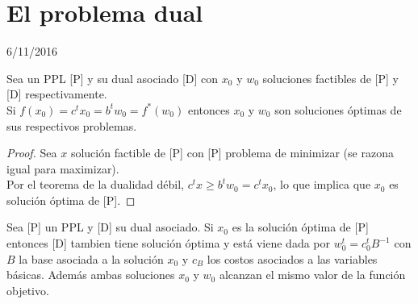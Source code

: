 \documentclass[11pt,fleqn]{book} %
\begin{document}
\chapter{El problema dual}
6/11/2016

\begin{theorem}
	Sea un PPL [P] y su dual asociado [D] con $x_0$ y $w_0$ soluciones factibles de [P] y [D] respectivamente. \\
	Si $f(x_0)=c^t x_0=b^t w_0=f^*(w_0)$ entonces $x_0$ y $w_0$ son soluciones óptimas de sus respectivos problemas.
\end{theorem}

\begin{proof}
	Sea $x$ solución factible de [P] con [P] problema de minimizar (se razona igual para maximizar). \\
	Por el teorema de la dualidad débil, $c^t x \geq b^t w_0=c^tx_0$, lo que implica que $x_0$ es solución óptima de [P].
\end{proof}


\begin{theorem}
	Sea [P] un PPL y [D] su dual asociado. Si $x_0$ es la solución óptima de [P] entonces [D] tambien tiene solución óptima y está viene dada por $w_0^t=c_0^t B^{-1}$ con $B$ la base asociada a la solución $x_0$ y $c_B$ los costos asociados a las variables básicas. Además ambas soluciones $x_0$ y $w_0$ alcanzan el mismo valor de la función objetivo.
\end{theorem}
\end{document}
